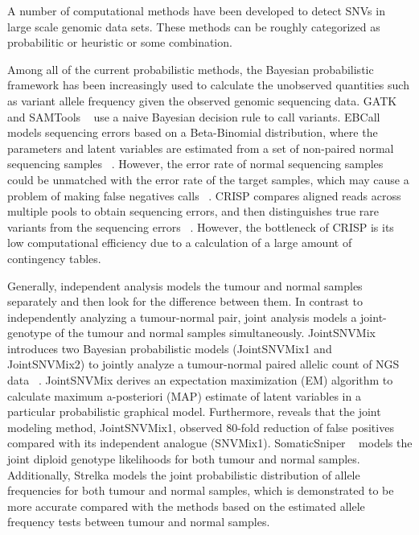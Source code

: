 \documentclass[11pt,reqno]{amsart}
\begin{document}
A number of computational methods have been developed to detect SNVs in large scale genomic data sets.
These methods can be roughly categorized as probabilitic or heuristic or some combination.

Among all of the current probabilistic methods, the Bayesian probabilistic framework has been increasingly used to calculate the unobserved quantities such as variant allele frequency given the observed genomic sequencing data.
GATK ~\citep{mckenna2010genome} and SAMTools ~\citep{li2009sequence} use a naive Bayesian decision rule to call variants.
EBCall models sequencing errors based on a Beta-Binomial distribution, where the parameters and latent variables are estimated from a set of non-paired normal sequencing samples ~\citep{shiraishi2013empirical}.
However, the error rate of normal sequencing samples could be unmatched with the error rate of the target samples, which may cause a problem of making false negatives calls ~\citep{wang2013detecting}.
CRISP compares aligned reads across multiple pools to obtain sequencing errors, and then distinguishes true rare variants from the sequencing errors ~\citep{bansal2010statistical}.
However, the bottleneck of CRISP is its low computational efficiency due to a calculation of a large amount of contingency tables.

Generally, independent analysis models the tumour and normal samples separately and then look for the difference between them.
In contrast to independently analyzing a tumour-normal pair, joint analysis models a joint-genotype of the tumour and normal samples simultaneously.
JointSNVMix introduces two Bayesian probabilistic models (JointSNVMix1 and JointSNVMix2) to jointly analyze a tumour-normal paired allelic count of NGS data ~\citep{roth2012jointsnvmix}.
JointSNVMix derives an expectation maximization (EM) algorithm to calculate maximum a-posteriori (MAP) estimate of latent variables in a particular probabilistic graphical model.
Furthermore, \citet{roth2012jointsnvmix} reveals that the joint modeling method, JointSNVMix1, observed 80-fold reduction of false positives compared with its independent analogue (SNVMix1).
SomaticSniper ~\citep{larson2012somaticsniper} models the joint diploid genotype likelihoods for both tumour and normal samples.
Additionally, Strelka \citet{saunders2012strelka} models the joint probabilistic distribution of allele frequencies for both tumour and normal samples, which is demonstrated to be more accurate compared with the methods based on the estimated allele frequency tests between tumour and normal samples.
\end{document}
